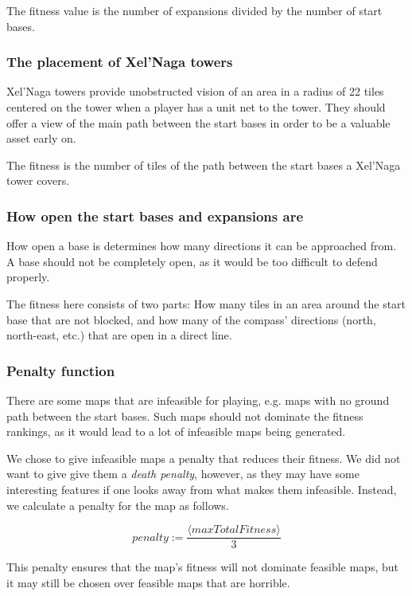 	The fitness value is the number of expansions divided by the number of start bases.

	\subsubsection*{The placement of Xel'Naga towers}
	Xel'Naga towers provide unobstructed vision of an area in a radius of 22 tiles centered on the tower when a player has a unit net to the tower. They should offer a view of the main path between the start bases in order to be a valuable asset early on. 

	The fitness is the number of tiles of the path between the start bases a Xel'Naga tower covers.

	\subsubsection*{How open the start bases and expansions are}
	How open a base is determines how many directions it can be approached from. A base should not be completely open, as it would be too difficult to defend properly. 

	The fitness here consists of two parts: How many tiles in an area around the start base that are not blocked, and how many of the compass' directions (north, north-east, etc.) that are open in a direct line.

\subsubsection{Penalty function}
\label{methodology_mapfitness_penalty}

There are some maps that are infeasible for playing, e.g. maps with no ground path between the start bases. Such maps should not dominate the fitness rankings, as it would lead to a lot of infeasible maps being generated. 

We chose to give infeasible maps a penalty that reduces their fitness. We did not want to give give them a \textit{death penalty}\cite{coello2012constraint}, however, as they may have some interesting features if one looks away from what makes them infeasible. Instead, we calculate a penalty for the map as follows.

\begin{equation}
	penalty := \frac{\langle maxTotalFitness\rangle}{3}
\end{equation}

This penalty ensures that the map's fitness will not dominate feasible maps, but it may still be chosen over feasible maps that are horrible.
